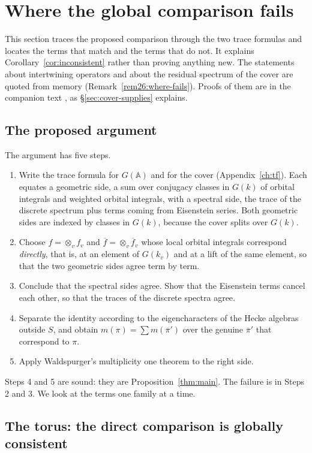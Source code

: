 \documentclass[12pt,letterpaper,openany]{book}
\theoremstyle{plain}
\theoremstyle{definition}
\theoremstyle{remark}
\theoremstyle{remark}
\begin{document}
\section{Where the global comparison fails}\label{sec:where-fails}

This section traces the proposed comparison through the two trace
formulas and locates the terms that match and the terms that do not. It
explains Corollary~\ref{cor:inconsistent} rather than proving anything
new. The statements about intertwining operators and about the residual
spectrum of the cover are quoted from memory
(Remark~\ref{rem26:where-fails}). Proofs of them are in the companion
text \cite{JC}, as \S\ref{sec:cover-supplies} explains.

\subsection*{The proposed argument}

The argument has five steps.
\begin{enumerate}
\item Write the trace formula for $G({\mathbb A})$ and for the cover
(Appendix~\ref{ch:tf}). Each equates a geometric side, a sum over
conjugacy classes in $G(k)$ of orbital integrals and weighted orbital
integrals, with a spectral side, the trace of the discrete spectrum plus
terms coming from Eisenstein series. Both geometric sides are indexed by
classes in $G(k)$, because the cover splits over $G(k)$.
\item Choose $f=\otimes_vf_v$ and $\overline f=\otimes_v\overline f_v$ whose
local orbital integrals correspond \emph{directly}, that is, at an element
of $G(k_v)$ and at a lift of the same element, so that the two geometric
sides agree term by term.
\item Conclude that the spectral sides agree. Show that the Eisenstein
terms cancel each other, so that the traces of the discrete spectra agree.
\item Separate the identity according to the eigencharacters of the Hecke
algebras outside $S$, and obtain
$m(\pi)=\sum m(\overline\pi')$ over the genuine $\overline\pi'$ that
correspond to $\pi$.
\item Apply Waldspurger's multiplicity one theorem to the right side.
\end{enumerate}
Steps 4 and 5 are sound: they are Proposition~\ref{thm:main}. The failure
is in Steps 2 and 3. We look at the terms one family at a time.

\subsection*{The torus: the direct comparison is globally consistent}
\end{document}
